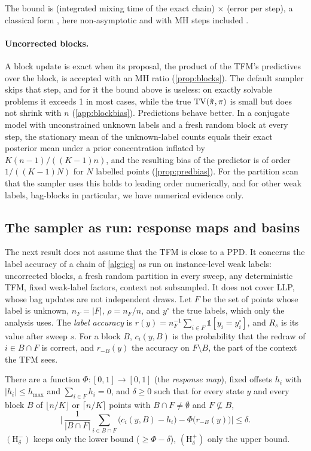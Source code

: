 The bound is (integrated mixing time of the exact chain) $\times$ (error per step), a classical form
\citep{schweitzer1968,meyer1980,seneta1988,cho2001}, here non-asymptotic and with MH steps included .

\paragraph{Uncorrected blocks.} A block update is exact when its proposal, the product of the TFM's predictives over the
block, is accepted with an MH ratio (\cref{prop:blocks}). The default sampler skips that step, and for it the bound
above is useless: on exactly solvable problems it exceeds 1 in most cases, while the true $\mathrm{TV}(\tilde\pi,\pi)$ is small
but does not shrink with $n$ (\cref{app:blockbias}). Predictions behave better. In a conjugate model with
unconstrained unknown labels and a fresh random block at every step, the stationary mean of the unknown-label counts
equals their exact posterior mean under a prior concentration inflated by $K(n-1)/((K-1)n)$, and the resulting bias of
the predictor is of order $1/((K-1)N)$ for $N$ labelled points (\cref{prop:predbias}). For the partition scan that the
sampler uses this holds to leading order numerically, and for other weak labels, bag-blocks in particular, we have
numerical evidence only.

\subsection{The sampler as run: response maps and basins}\label{sec:dynamics}
The next result does not assume that the TFM is close to a PPD. It concerns the label accuracy of a chain of
\cref{alg:icg} as run on instance-level weak labels: uncorrected blocks, a fresh random partition in every sweep, any
deterministic TFM, fixed weak-label factors, context not subsampled. It does not cover LLP, whose bag updates are not
independent draws. Let $F$ be the set of points whose label is unknown, $n_F=\lvert F\rvert$, $\rho=n_F/n$, and $y^\circ$
the true labels, which only the analysis uses. The \emph{label accuracy} is
$r(y)=n_F^{-1}\sum_{i\in F}\mathbb 1[y_i=y_i^\circ]$, and $R_s$ is its value after sweep $s$. For a block $B$, $c_i(y,B)$ is the
probability that the redraw of $i\in B\cap F$ is correct, and $r_{-B}(y)$ the accuracy on $F\setminus B$, the part of
the context the TFM sees.

\begin{assumption}\label{ass:H}
There are a function $\Phi:[0,1]\to[0,1]$ (the \emph{response map}), fixed offsets $h_i$ with $\lvert h_i\rvert\le h_{\max}$
and $\sum_{i\in F}h_i=0$, and $\delta\ge0$ such that for every state $y$ and every block $B$ of $\lfloor n/K\rfloor$ or
$\lceil n/K\rceil$ points with $B\cap F\neq\emptyset$ and $F\not\subseteq B$,
\[
  \Big\lvert\,\frac{1}{\lvert B\cap F\rvert}\sum_{i\in B\cap F}\big(c_i(y,B)-h_i\big)-\Phi\big(r_{-B}(y)\big)\Big\rvert\le\delta .
\]
$(\mathrm H^-_\delta)$ keeps only the lower bound ($\ge\Phi-\delta$), $(\mathrm H^+_\delta)$ only the upper bound.
\end{assumption}

